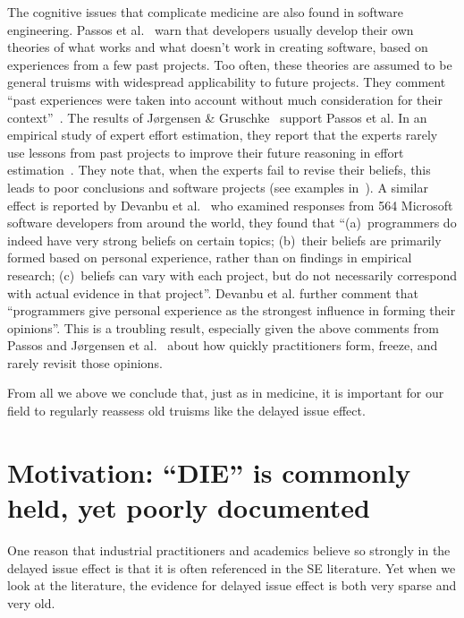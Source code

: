 \documentclass[smallcondensed]{svjour3}
\newcommand{\fig}[1]{Figure~\ref{fig:#1}}
\begin{document}
The cognitive issues that complicate medicine are also found in software engineering.
Passos et al.~\cite{passos11} warn that developers
usually develop their own theories of what works and what doesn't work in creating software, based on experiences from a few past
projects. Too often, these theories are assumed to be general truisms with widespread applicability to future projects. They comment ``past experiences were taken into account without 
much consideration for their context''~\cite{passos11}.
The results of J{\o}rgensen \& Gruschke~\cite{jorgensen09} support Passos et al. In an empirical study of expert effort estimation, they report that the experts rarely use lessons
  from past projects to improve their future reasoning in effort estimation~\cite{jorgensen09}. 
 They note that,
when the experts
  fail to revise their beliefs, this leads to poor
 conclusions and software projects  (see examples in~\cite{jorgensen09}).
 A similar effect is reported by
Devanbu et al.~\cite{prem16}  who examined responses from 564 Microsoft software developers from around
the world, they found that  ``(a)~programmers do indeed have very
strong beliefs on certain topics; (b)~their beliefs are primarily formed
based on personal experience, rather than on findings in empirical
research; (c)~beliefs can vary with each project, but do not necessarily
correspond with actual evidence in that project''.
Devanbu et al. further  comment that ``programmers give personal experience
as the strongest influence in forming their opinions''. This is a troubling
result, especially given the above comments from Passos and  J{\o}rgensen et al.~\cite{passos11,jorgensen09} about how quickly practitioners form, freeze, and rarely revisit those opinions.

 
 
From all we above we conclude that, just as in medicine, 
 it is important for our field
 to regularly  reassess old truisms  like the  delayed issue effect.
  
 
 
\section{Motivation: ``DIE'' is commonly held, yet poorly documented}
\label{sect:belief}
One reason that industrial practitioners and academics believe so strongly in the delayed issue effect is that it is often referenced
in the SE literature. 
Yet when we look at the literature, the evidence for
delayed issue effect is both very sparse and very old.
\end{document}
